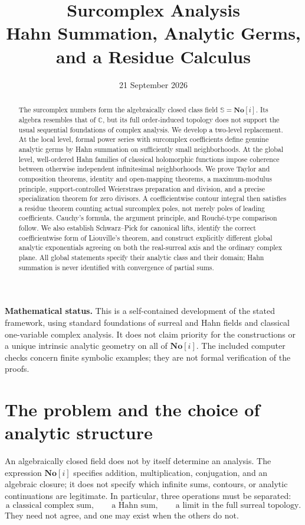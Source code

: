 \documentclass[11pt,a4paper]{article}
\title{\textbf{Surcomplex Analysis}\\[5pt]
\large Hahn Summation, Analytic Germs, and a Residue Calculus}
\author{}
\date{21 September 2026}
\theoremstyle{definition}
\theoremstyle{remark}
\newcommand{\No}{\mathbf{No}}
\newcommand{\SC}{\mathbb S}
\newcommand{\C}{\mathbb C}
\begin{document}
\maketitle
\begin{abstract}
The surcomplex numbers form the algebraically closed class field
$\SC=\No[i]$. Its algebra resembles that of $\C$, but its full
order-induced topology does not support the usual sequential foundations
of complex analysis. We develop a two-level replacement. At the local
level, formal power series with surcomplex coefficients define genuine
analytic germs by Hahn summation on sufficiently small neighborhoods.
At the global level, well-ordered Hahn families of classical holomorphic
functions impose coherence between otherwise independent infinitesimal
neighborhoods. We prove Taylor and composition theorems, identity and
open-mapping theorems, a maximum-modulus principle, support-controlled
Weierstrass preparation and division, and a precise specialization theorem
for zero divisors. A coefficientwise contour integral then satisfies a
residue theorem counting actual surcomplex poles, not merely poles of
leading coefficients. Cauchy's formula, the argument principle, and
Rouch\'e-type comparison follow. We also establish Schwarz--Pick for
canonical lifts, identify the correct coefficientwise form of Liouville's
theorem, and construct explicitly different global analytic exponentials
agreeing on both the real-surreal axis and the ordinary complex plane.
All global statements specify their analytic class and their domain;
Hahn summation is never identified with convergence of partial sums.
\end{abstract}
\noindent\textbf{Mathematical status.} This is a self-contained development
of the stated framework, using standard foundations of surreal and Hahn
fields and classical one-variable complex analysis. It does not claim
priority for the constructions or a unique intrinsic analytic geometry
on all of $\No[i]$. The included computer checks concern finite symbolic
examples; they are not formal verification of the proofs.
\clearpage
\begingroup
\small
\setlength{\parskip}{0pt}
\makeatletter
\renewcommand*\l@section[2]{\addvspace{3pt}%
  \@dottedtocline{1}{0pt}{1.8em}{\bfseries #1}{\bfseries #2}}
\makeatother
\tableofcontents
\endgroup
\clearpage

\section{The problem and the choice of analytic structure}\label{sec:intro}
An algebraically closed field does not by itself determine an analysis.
The expression $\No[i]$ specifies addition, multiplication, conjugation,
and an algebraic closure; it does not specify which infinite sums,
contours, or analytic continuations are legitimate. In particular, three
operations must be separated:
\[
 \text{a classical complex sum},\qquad
 \text{a Hahn sum},\qquad
 \text{a limit in the full surreal topology}.
\]
They need not agree, and one may exist when the others do not.
\end{document}
